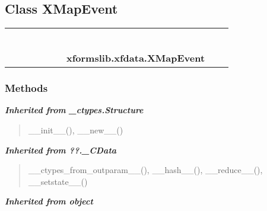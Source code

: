 \subsection{Class XMapEvent}

    \label{xformslib:xfdata:XMapEvent}
\begin{tabular}{cccccccccc}
\multicolumn{2}{r}{\settowidth{\BCL}{object}\multirow{2}{\BCL}{object}}
&&
&&
&&
  \\\cline{3-3}
  &&\multicolumn{1}{c|}{}
&&
&&
&&
  \\
\multicolumn{4}{r}{\settowidth{\BCL}{??.\_CData}\multirow{2}{\BCL}{??.\_CData}}
&&
&&
  \\\cline{5-5}
  &&&&\multicolumn{1}{c|}{}
&&
&&
  \\
\multicolumn{6}{r}{\settowidth{\BCL}{\_ctypes.Structure}\multirow{2}{\BCL}{\_ctypes.Structure}}
&&
  \\\cline{7-7}
  &&&&&&\multicolumn{1}{c|}{}
&&
  \\
&&&&&&\multicolumn{2}{l}{\textbf{xformslib.xfdata.XMapEvent}}
\end{tabular}



  \subsubsection{Methods}


\large{\textbf{\textit{Inherited from \_ctypes.Structure}}}

\begin{quote}
\_\_init\_\_(), \_\_new\_\_()
\end{quote}

\large{\textbf{\textit{Inherited from ??.\_CData}}}

\begin{quote}
\_\_ctypes\_from\_outparam\_\_(), \_\_hash\_\_(), \_\_reduce\_\_(), \_\_setstate\_\_()
\end{quote}

\large{\textbf{\textit{Inherited from object}}}

